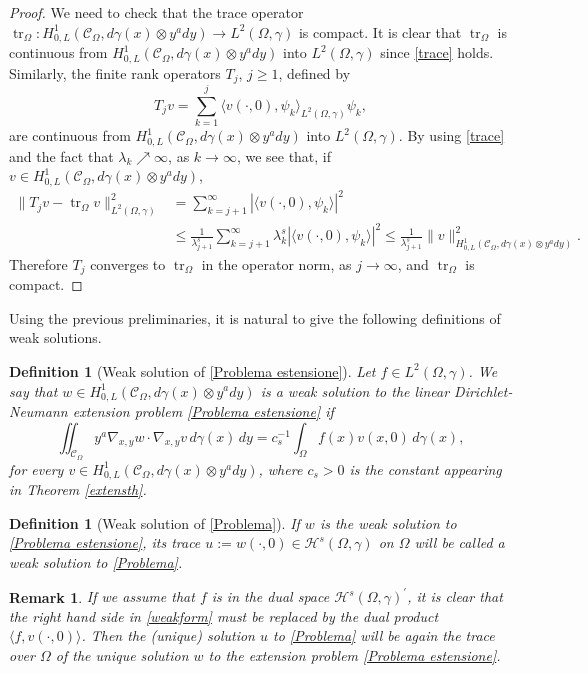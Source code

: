 \documentclass[a4paper,10pt,reqno]{amsart}
\newcommand{\tr}{\operatorname{tr}}
\newtheorem{remark}[theorem]{Remark}
\newtheorem{definition}[theorem]{Definition}
\numberwithin{equation}{section}
\begin{document}
\begin{proof}
We need to check that the trace operator $\operatorname{tr}_\Omega:
H_{0,L}^{1}(\mathcal{C}_{\Omega},d\gamma(x)\otimes y^ady)\to L^{2}(\Omega,\gamma)$ is compact.
It is clear that $\operatorname{tr}_\Omega$ is continuous from
$H_{0,L}^{1}(\mathcal{C}_{\Omega},d\gamma(x)\otimes y^ady)$ into $L^2(\Omega,\gamma)$
since \eqref{trace} holds. Similarly, the finite rank operators $T_j$, $j\geq1$, defined by
$$T_jv=\sum_{k=1}^j\langle v(\cdot,0),\psi_k\rangle_{L^2(\Omega,\gamma)}\psi_k,$$
are continuous from
$H_{0,L}^{1}(\mathcal{C}_{\Omega},d\gamma(x)\otimes y^ady)$ into $L^{2}(\Omega,\gamma)$.
By using \eqref{trace} and the fact that $\lambda_k\nearrow\infty$, as $k\to\infty$, we see that,
if $v\in H_{0,L}^{1}(\mathcal{C}_{\Omega},d\gamma(x)\otimes y^ady)$,
\begin{align*}
\|T_jv-\tr_\Omega v\|_{L^2(\Omega,\gamma)}^2 &= \sum_{k=j+1}^\infty|\langle v(\cdot,0),\psi_k\rangle|^2 \\
&\leq \frac{1}{\lambda_{j+1}^s}\sum_{k=j+1}^\infty\lambda_k^s|\langle v(\cdot,0),\psi_k\rangle|^2
\leq \frac{1}{\lambda_{j+1}^s}\|v\|^2_{H_{0,L}^{1}(\mathcal{C}_{\Omega},d\gamma(x)\otimes y^ady)}.
\end{align*}
Therefore $T_j$ converges to $\tr_\Omega$ in the operator norm, as $j\to\infty$, and $\tr_\Omega$ is compact.
\end{proof}

Using the previous preliminaries, it is natural to give the following definitions of weak solutions.

\begin{definition}[Weak solution of \eqref{Problema estensione}]\label{Defprobest}
Let $f\in L^{2}(\Omega,\gamma)$. We say that $w\in H^{1}_{0,L}
(\mathcal{C}_{\Omega},d\gamma(x)\otimes y^ady)$ is a weak solution to the linear Dirichlet-Neumann extension problem \eqref{Problema estensione} if
\begin{equation}\iint_{\mathcal{C}_{\Omega}}y^a\nabla_{x,y}w\cdot\nabla_{x,y}v\,d\gamma
(x)\,dy=c_s^{-1}\int_{\Omega}f(x)v(x,0)\,d\gamma(x),\label{weakform}\end{equation}
for every $v\in H^{1}_{0,L}(\mathcal{C}_{\Omega},d\gamma(x)\otimes y^ady)$, where
$c_s>0$ is the constant appearing in Theorem \ref{extensth}.
\end{definition}

\begin{definition}[Weak solution of \eqref{Problema}]
If $w$ is the weak solution to \eqref{Problema estensione}, its trace $u:=w(\cdot,0)\in \mathcal{H}^{s}(\Omega,\gamma)$ on $\Omega$ will be called a weak
solution to
\eqref{Problema}.

\end{definition}
\begin{remark}
If we assume that $f$ is in the dual space $\mathcal{H}^{s}(\Omega,\gamma)^{\prime}$, it is clear that the right hand side
in \eqref{weakform} must be replaced by the dual product
$\langle f,v(\cdot,0)\rangle$. Then the (unique) solution $u$ to \eqref{Problema} will be again the trace over $\Omega$ of the unique solution $w$ to the
extension problem \eqref{Problema estensione}.
\end{remark}
\end{document}
